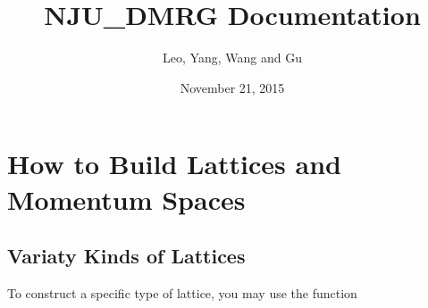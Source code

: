 \documentclass[letterpaper,10pt,oneside,openany]{sphinxmanual}
\title{NJU\_DMRG Documentation}
\date{November 21, 2015}
\author{Leo, Yang, Wang and Gu}
\begin{document}
\maketitle
\tableofcontents
{}\label{index::doc}



\chapter{How to Build Lattices and Momentum Spaces}
\label{index:welcome-to-nju-dmrg-s-documentation-lattice-and-hamiltonian}\label{index:how-to-build-lattices-and-momentum-spaces}

\section{Variaty Kinds of Lattices}
\label{index:variaty-kinds-of-lattices}\label{index:module-lattice.latticelib}
To construct a specific type of lattice, you may use the function
\end{document}
